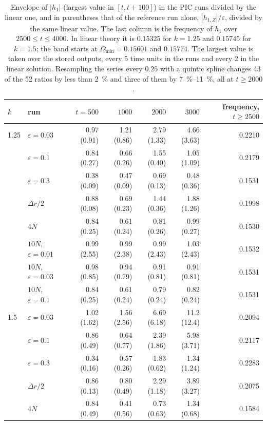 \documentclass[11pt,a4paper]{article}
\begin{document}
\begin{table}[!htbp]
\centering
\small
\begin{tabular}{llrrrrr}
\toprule
$k$ & run & $t=500$ & $1000$ & $2000$ & $3000$ & frequency, $t\ge2500$\\
\midrule
1.25 & $\varepsilon=0.03$ & 0.97 (0.91) & 1.21 (0.86) & 2.79 (1.33) & 4.66 (3.63) & 0.2210\\
 & $\varepsilon=0.1$ & 0.84 (0.27) & 0.66 (0.26) & 1.55 (0.40) & 1.05 (1.09) & 0.2179\\
 & $\varepsilon=0.3$ & 0.38 (0.09) & 0.47 (0.09) & 0.69 (0.13) & 0.48 (0.36) & 0.1531\\
 & $\Delta r/2$ & 0.88 (0.08) & 0.69 (0.23) & 1.44 (0.36) & 1.88 (1.26) & 0.1998\\
 & $4N$ & 0.84 (0.25) & 0.61 (0.24) & 0.81 (0.26) & 0.99 (0.27) & 0.1530\\
 & $10N$, $\varepsilon=0.01$ & 0.99 (2.55) & 0.99 (2.38) & 0.99 (2.43) & 1.03 (2.43) & 0.1532\\
 & $10N$, $\varepsilon=0.03$ & 0.98 (0.85) & 0.94 (0.79) & 0.91 (0.81) & 0.91 (0.81) & 0.1531\\
 & $10N$, $\varepsilon=0.1$ & 0.84 (0.25) & 0.61 (0.24) & 0.79 (0.24) & 0.82 (0.24) & 0.1531\\
\midrule
1.5 & $\varepsilon=0.03$ & 1.02 (1.62) & 1.56 (2.56) & 6.69 (6.18) & 11.2 (12.4) & 0.2094\\
 & $\varepsilon=0.1$ & 0.86 (0.49) & 0.64 (0.77) & 2.39 (1.86) & 5.98 (3.71) & 0.2117\\
 & $\varepsilon=0.3$ & 0.34 (0.16) & 0.57 (0.26) & 1.83 (0.62) & 1.34 (1.24) & 0.2283\\
 & $\Delta r/2$ & 0.86 (0.13) & 0.80 (0.49) & 2.29 (1.18) & 3.89 (3.27) & 0.2075\\
 & $4N$ & 0.84 (0.49) & 0.41 (0.56) & 0.73 (0.63) & 1.34 (0.68) & 0.1584\\
\bottomrule
\end{tabular}
\caption{Envelope of $|h_1|$ (largest value in $[t,t+100]$) in the PIC runs divided by the
linear one, and in parentheses that of the reference run alone, $|h_{1,Z}|/\varepsilon$, divided
by the same linear value. The last column is the frequency of $h_1$ over $2500\le t\le4000$. In
linear theory it is $0.15325$ for $k=1.25$ and $0.15745$ for $k=1.5$; the band starts at
$\Omega_{\min}=0.15601$ and $0.15774$. The largest value is taken over the stored outputs, every 5
time units in the runs and every 2 in the linear solution. Resampling the series every $0.25$
with a quintic spline changes 43 of the 52 ratios by less than \SI{2}{\%} and three of them by
\SIrange{7}{11}{\%}, all at $t\ge2000$.}
\label{tab:borde}
\end{table}
\end{document}
